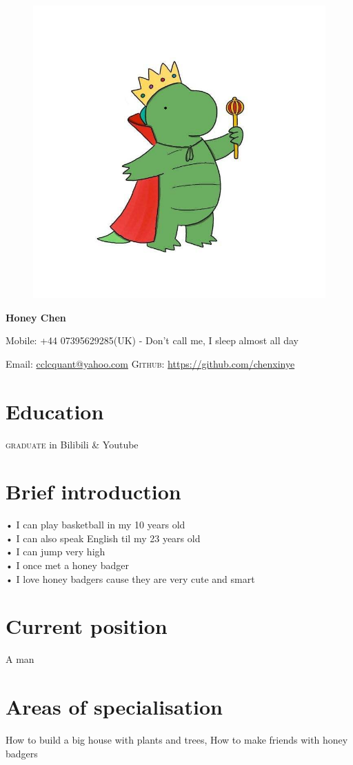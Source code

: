 \documentclass[11pt]{article}
\begin{document}
\begin{figure}
	\centering
	\includegraphics[width=.5\textwidth]{honey.jpg}
	\label{honey profile} 
\end{figure}


{\LARGE\bfseries Honey Chen}
\bigskip\medskip


Mobile: +44 07395629285(UK) - Don't call me, I sleep almost all day 
\medskip

\medskip
Email: \href{mailto:cclcquant@yahoo.com}{cclcquant@yahoo.com}
\textsc{Github}: \href{https://github.com/chenxinye}{https://github.com/chenxinye}

\section*{Education}
\textsc{graduate} in Bilibili \& Youtube


\section*{Brief introduction}
• I can play basketball in my 10 years old\\
• I can also speak English til my 23 years old\\
• I can jump very high\\
• I once met a honey badger\\
• I love honey badgers cause they are very cute and smart


\section*{Current position}
A man


\section*{Areas of specialisation}
How to build a big house with plants and trees, How to make friends with honey badgers
\end{document}
